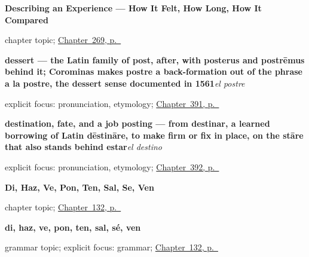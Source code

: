 \noindent\begin{minipage}[t]{\linewidth}
\raggedright
\textbf{Describing an Experience --- How It Felt, How Long, How It Compared}\par
\footnotesize chapter topic; \hyperref[ch:experiencia]{Chapter~269, p.~\pageref*{ch:experiencia}}
\end{minipage}\par\smallskip

\noindent\begin{minipage}[t]{\linewidth}
\raggedright
\textbf{dessert — the Latin family of post, after, with posterus and postrēmus behind it; Corominas makes postre a back-formation out of the phrase a la postre, the dessert sense documented in 1561}\enspace\emph{el postre}\par
\footnotesize explicit focus: pronunciation, etymology; \hyperref[ch:el-menu-y-el-camarero]{Chapter~391, p.~\pageref*{ch:el-menu-y-el-camarero}}
\end{minipage}\par\smallskip

\noindent\begin{minipage}[t]{\linewidth}
\raggedright
\textbf{destination, fate, and a job posting — from destinar, a learned borrowing of Latin dēstināre, to make firm or fix in place, on the stāre that also stands behind estar}\enspace\emph{el destino}\par
\footnotesize explicit focus: pronunciation, etymology; \hyperref[ch:el-aeropuerto-y-las-vacaciones]{Chapter~392, p.~\pageref*{ch:el-aeropuerto-y-las-vacaciones}}
\end{minipage}\par\smallskip

\noindent\begin{minipage}[t]{\linewidth}
\raggedright
\textbf{Di, Haz, Ve, Pon, Ten, Sal, Se, Ven}\par
\footnotesize chapter topic; \hyperref[ch:command-irregular]{Chapter~132, p.~\pageref*{ch:command-irregular}}
\end{minipage}\par\smallskip

\noindent\begin{minipage}[t]{\linewidth}
\raggedright
\textbf{di, haz, ve, pon, ten, sal, sé, ven}\par
\footnotesize grammar topic; explicit focus: grammar; \hyperref[ch:command-irregular]{Chapter~132, p.~\pageref*{ch:command-irregular}}
\end{minipage}\par\smallskip


